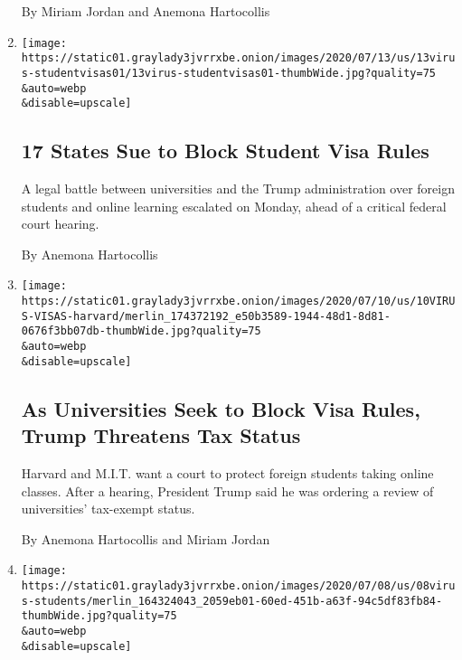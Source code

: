 \begin{enumerate}
  By Miriam Jordan and Anemona Hartocollis
\item
  \href{/2020/07/13/us/f1-student-visas-trump.html}{}

  \texttt{[image: https://static01.graylady3jvrrxbe.onion/images/2020/07/13/us/13virus-studentvisas01/13virus-studentvisas01-thumbWide.jpg?quality=75\\\&auto=webp\\\&disable=upscale]}

  \hypertarget{17-states-sue-to-block-student-visa-rules}{%
  \subsection{17 States Sue to Block Student Visa
  Rules}\label{17-states-sue-to-block-student-visa-rules}}

  A legal battle between universities and the Trump administration over
  foreign students and online learning escalated on Monday, ahead of a
  critical federal court hearing.

  By Anemona Hartocollis
\item
  \href{/2020/07/10/us/f1-student-visa-lawsuit.html}{}

  \texttt{[image: https://static01.graylady3jvrrxbe.onion/images/2020/07/10/us/10VIRUS-VISAS-harvard/merlin\_174372192\_e50b3589-1944-48d1-8d81-0676f3bb07db-thumbWide.jpg?quality=75\\\&auto=webp\\\&disable=upscale]}

  \hypertarget{as-universities-seek-to-block-visa-rules-trump-threatens-tax-status}{%
  \subsection{As Universities Seek to Block Visa Rules, Trump Threatens
  Tax
  Status}\label{as-universities-seek-to-block-visa-rules-trump-threatens-tax-status}}

  Harvard and M.I.T. want a court to protect foreign students taking
  online classes. After a hearing, President Trump said he was ordering
  a review of universities' tax-exempt status.

  By Anemona Hartocollis and Miriam Jordan
\item
  \href{/2020/07/08/us/harvard-mit-trump-ice-students.html}{}

  \texttt{[image: https://static01.graylady3jvrrxbe.onion/images/2020/07/08/us/08virus-students/merlin\_164324043\_2059eb01-60ed-451b-a63f-94c5df83fb84-thumbWide.jpg?quality=75\\\&auto=webp\\\&disable=upscale]}

  \hypertarget{harvard-and-mit-sue-to-stop-trump-visa-rules-for-foreign-students}{%
}
\end{enumerate}
